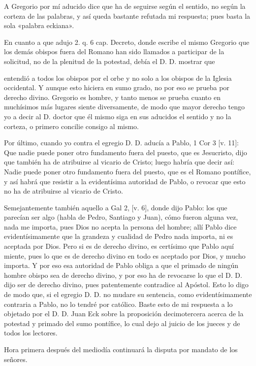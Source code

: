 A Gregorio por mí aducido dice que ha de seguirse según el sentido, no según la corteza de las palabras, y así queda bastante refutada mi respuesta; pues basta la sola «palabra eckiana».

En cuanto a que adujo 2. q. 6 cap. Decreto, donde escribe el mismo Gregorio que los demás obispos fuera del Romano han sido llamados a participar de la solicitud, no de la plenitud de la potestad, debía el D. D. mostrar que

entendió a todos los obispos por el orbe y no solo a los obispos de la Iglesia occidental. Y aunque esto hiciera en sumo grado, no por eso se prueba por derecho divino. Gregorio es hombre, y tanto menos se prueba cuanto en muchísimos más lugares siente diversamente, de modo que mayor derecho tengo yo a decir al D. doctor que él mismo siga en sus aducidos el sentido y no la corteza, o primero concilie consigo al mismo.

Por último, cuando yo contra el egregio D. D. aducía a Pablo, 1 Cor 3 [v. 11]: Que nadie puede poner otro fundamento fuera del puesto, que es Jesucristo, dijo que también ha de atribuirse al vicario de Cristo; luego habría que decir así: Nadie puede poner otro fundamento fuera del puesto, que es el Romano pontífice, y así habrá que resistir a la evidentísima autoridad de Pablo, o revocar que esto no ha de atribuirse al vicario de Cristo.

Semejantemente también aquello a Gal 2, [v. 6], donde dijo Pablo: los que parecían ser algo (habla de Pedro, Santiago y Juan), cómo fueron alguna vez, nada me importa, pues Dios no acepta la persona del hombre; allí Pablo dice evidentísimamente que la grandeza y cualidad de Pedro nada importa, ni es aceptada por Dios. Pero si \marginpar{\small[290]} es de derecho divino, es certísimo que Pablo aquí miente, pues lo que es de derecho divino en todo es aceptado por Dios, y mucho importa. Y por eso esa autoridad de Pablo obliga a que el primado de ningún hombre obispo sea de derecho divino, y por eso ha de revocarse lo que el D. D. dijo ser de derecho divino, pues patentemente contradice al Apóstol. Esto lo digo de modo que, si el egregio D. D. no mudare su sentencia, como evidentísimamente contraria a Pablo, no lo tendré por católico. Baste esto de mi respuesta a lo objetado por el D. D. Juan Eck sobre la proposición decimotercera acerca de la potestad y primado del sumo pontífice, lo cual dejo al juicio de los jueces y de todos los lectores.

Hora primera después del mediodía continuará la disputa por mandato de los señores.

